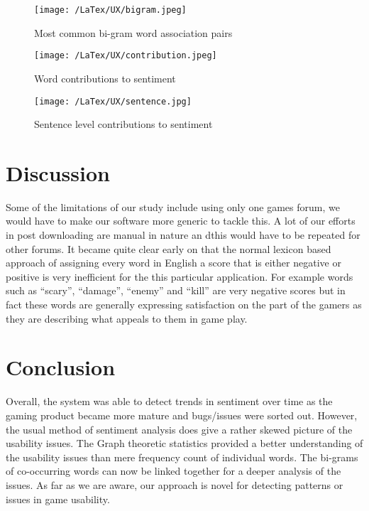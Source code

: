 \documentclass{svproc}
\begin{document}
\begin{figure}[hp]
  \begin{center}
 \texttt{[image: /LaTex/UX/bigram.jpeg]} %
  \end{center}
 \caption{Most common bi-gram word association pairs}
\label{wordpairs}
\end{figure}


\begin{figure}[hp]
  \begin{center}
 \texttt{[image: /LaTex/UX/contribution.jpeg]} %
  \end{center}
 \caption{Word contributions to sentiment}
\label{words}
\end{figure}

\begin{figure}[hp]
  \begin{center}
 \texttt{[image: /LaTex/UX/sentence.jpg]} %
  \end{center}
 \caption{Sentence level contributions to sentiment}
\label{sentiment2}
\end{figure}

\section{Discussion}
Some of the limitations of our study include using only one games forum, we would have to make our software more generic to tackle this. A lot of our efforts in post downloading are manual in nature an dthis would have to be repeated for other forums. It became quite clear early on that the normal lexicon based approach of assigning every word in English a score that is either negative or positive is very inefficient for the this particular application. For example words such as ``scary'', ``damage'', ``enemy'' and ``kill'' are very negative scores but in fact these words are generally expressing satisfaction on the part of the gamers as they are describing what appeals to them in game play. 

\section{Conclusion}
Overall, the system was able to detect trends in sentiment over time as the gaming product became more mature and bugs/issues were sorted out. However, the usual method of sentiment analysis does give a rather skewed picture of the usability issues. The Graph theoretic statistics provided a better understanding of the usability issues than mere frequency count of individual words. The bi-grams of co-occurring words can now be linked together for a deeper analysis of the issues. As far as we are aware, our approach is novel for detecting patterns or issues in game usability.
\end{document}
